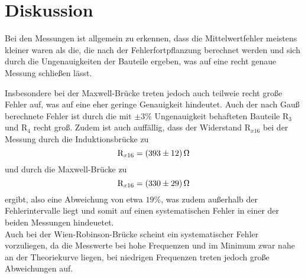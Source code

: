 \section{Diskussion}
Bei den Messungen ist allgemein zu erkennen, dass die Mittelwertfehler
meistens kleiner waren als die, die nach der Fehlerfortpflanzung berechnet werden und sich durch
die Ungenauigkeiten der Bauteile ergeben, was auf eine recht genaue Messung schließen lässt.

\noindent Insbesondere bei der Maxwell-Brücke treten jedoch auch teilweie
recht große Fehler auf, was auf eine eher geringe Genauigkeit hindeutet. Auch der nach Gauß
berechnete Fehler ist durch die mit $\pm 3 \% $ Ungenauigkeit behafteten Bauteile
$\text{R}_3 $ und $\text{R}_4 $ recht groß.
Zudem ist auch auffällig, dass der Widerstand $ \text{R}_{x16} $ bei der Messung
durch die Induktionsbrücke zu
\begin{equation*}
  \text{R}_{x16} = \SI{393 (12)}{\ohm}
\end{equation*}
und durch die Maxwell-Brücke zu
\begin{equation*}
  \text{R}_{x16} = \SI{330 (29)}{\ohm}
\end{equation*}
ergibt, also eine Abweichung von etwa $ 19 \% $, was zudem außerhalb der
Fehlerintervalle liegt und somit auf einen systematischen Fehler in einer der beiden
Messungen hindeuetet.\\
\noindent Auch bei der Wien-Robinson-Brücke scheint ein systematischer Fehler vorzuliegen,
da die Messwerte bei hohe Frequenzen und im Minimum zwar nahe an der Theoriekurve
liegen, bei niedrigen Frequenzen treten jedoch große Abweichungen auf.
